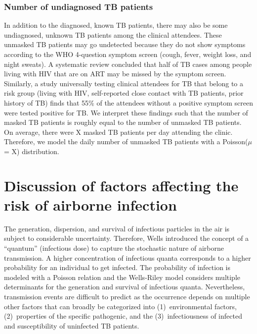 \documentclass[fleqn,11pt]{wlscirep_supp}
\begin{document}
\subsubsection{Number of undiagnosed TB patients}


In addition to the diagnosed, known TB patients, there may also be some undiagnosed, unknown TB patients among the clinical attendees. These unmasked TB patients may go undetected because they do not show symptoms according to the WHO 4-question symptom screen (cough, fever, weight loss, and night sweats). A systematic review concluded that half of TB cases among people living with HIV that are on ART may be missed by the symptom screen\cite{Hamada2018LancetHIV}. Similarly, a study universally testing clinical attendees for TB that belong to a risk group (living with HIV, self-reported close contact with TB patients, prior history of TB) finds that 55\% of the attendees without a positive symptom screen were tested positive for TB\cite{Berhanu2023CID}. We interpret these findings such that the number of masked TB patients is roughly equal to the number of unmasked TB patients. On average, there were X masked TB patients per day attending the clinic. Therefore, we model the daily number of unmasked TB patients with a Poisson($\mu$ = X) distribution. 



\clearpage

\section{Discussion of factors affecting the risk of airborne infection}\label{sec:depth-discussion}


The generation, dispersion, and survival of infectious particles in the air is subject to considerable uncertainty. Therefore, Wells\cite{Wells1955} introduced the concept of a ``quantum'' (infectious dose) to capture the stochastic nature of airborne transmission. A higher concentration of infectious quanta corresponds to a higher probability for an individual to get infected. The probability of infection is modeled with a Poisson relation and the Wells-Riley model considers multiple determinants for the generation and survival of infectious quanta. Nevertheless, transmission events are difficult to predict as the occurrence depends on multiple other factors that can broadly be categorized into (1)~environmental factors, (2)~properties of the specific pathogenic, and the (3)~infectiousness of infected and susceptibility of uninfected TB patients. 
\end{document}
